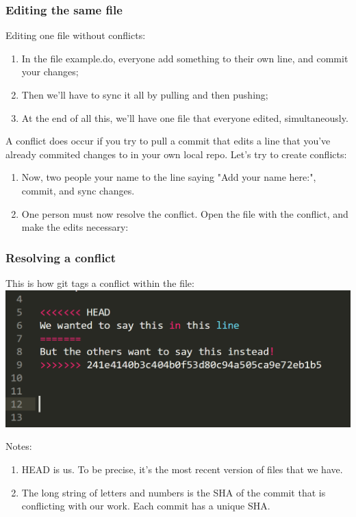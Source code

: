 \documentclass{beamer}
\begin{document}
\begin{frame}
	\frametitle{Editing the same file}
	Editing one file without conflicts:
	\begin{enumerate}
		\item<2-> In the file example.do, everyone add something to their own line, and commit your changes;
		\item<2-> Then we'll have to sync it all by pulling and then pushing;
		\item<2-> At the end of all this, we'll have one file that everyone edited, simultaneously.
	\end{enumerate}
	A conflict does occur if you try to pull a commit that edits a line that you've already commited changes to in your own local repo. Let's try to create conflicts:
	\begin{enumerate}
		\item<3-> Now, two people your name to the line saying "Add your name here:", commit, and sync changes.
		\item<3-> One person must now resolve the conflict. Open the file with the conflict, and make the edits necessary:
	\end{enumerate}
	
\end{frame}

\begin{frame}
	\frametitle{Resolving a conflict}
	This is how git tags a conflict within the file:
	\hfill\includegraphics[width=1\linewidth]{figures/conflict.png}\hfill\strut
	Notes:
	\begin{enumerate}
		\item HEAD is us. To be precise, it's the most recent version of files that we have.
		\item The long string of letters and numbers is the SHA of the commit that is conflicting with our work. Each commit has a unique SHA.
	\end{enumerate}
\end{frame}
\end{document}
